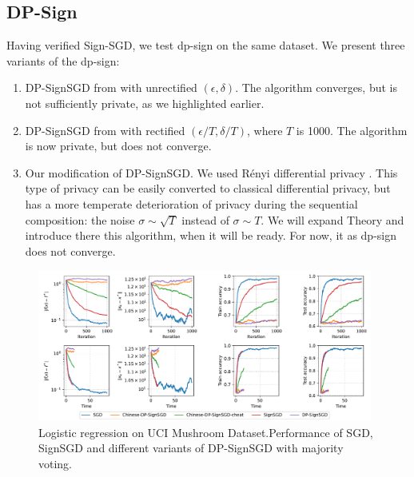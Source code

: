 \documentclass[12pt]{article}
\begin{document}
\subsection{DP-Sign}
Having verified Sign-SGD, we test dp-sign on the same dataset. We present three variants of the dp-sign:
\begin{enumerate}
    \item DP-SignSGD from \cite{Jin2020} with unrectified $(\epsilon, \delta)$. The algorithm converges, but is not sufficiently private, as we highlighted earlier.
    \item DP-SignSGD from \cite{Jin2020} with rectified $(\epsilon / T, \delta /T)$, where $T$ is 1000. The algorithm is now private, but does not converge.
    \item Our modification of DP-SignSGD. We used Rényi differential privacy \cite{Dwork2014}. This type of privacy can be easily converted to classical differential privacy, but has a more temperate deterioration of privacy during the sequential composition: the noise $\sigma \sim \sqrt{T}$ instead of $\sigma \sim T$. We will expand Theory and introduce there this algorithm, when it will be ready. For now, it as dp-sign does not converge.
\end{enumerate}
\begin{figure}[h]
    \centering
    \includegraphics[width=0.98\textwidth]{../figs/dps_diverge.pdf}
    \caption{Logistic regression on UCI Mushroom Dataset.\newline Performance of SGD, SignSGD and different variants of DP-SignSGD with majority voting.}
    \label{fig:dp-diverges}
\end{figure}
\end{document}
